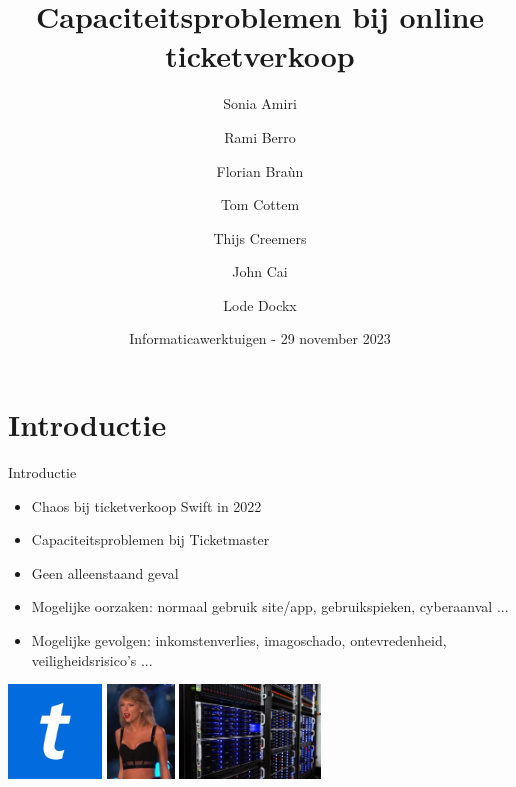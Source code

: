 \documentclass{beamer}
\title[Capaciteitsproblemen]{\Huge{Capaciteitsproblemen bij online ticketverkoop}}
\author[Groep 2]{Sonia Amiri \and Rami Berro \and Florian Braùn \and Tom Cottem \and Thijs Creemers \and John Cai \and Lode Dockx}
\date[IW]{\small{Informaticawerktuigen - 29 november 2023}}
\begin{document}
\begin{frame}
  \titlepage
\end{frame}


\section[Intro]{Introductie}
\begin{frame}{Introductie}
    \begin{itemize}
        \item Chaos bij ticketverkoop Swift in 2022
        \item Capaciteitsproblemen bij Ticketmaster
        \item Geen alleenstaand geval
        \item Mogelijke oorzaken: normaal gebruik site/app, gebruikspieken, cyberaanval ...
        \item Mogelijke gevolgen: inkomstenverlies, imagoschado, ontevredenheid, veiligheidsrisico's ...
    \end{itemize}
    \begin{center}
        \includegraphics[height = 2.5cm]{ticketmaster-logo.png}
        \includegraphics[height = 2.5cm]{taylor-swift.png}
        \includegraphics[height = 2.5cm]{server-rack.jpg}
    \end{center}
\end{frame}
\end{document}
